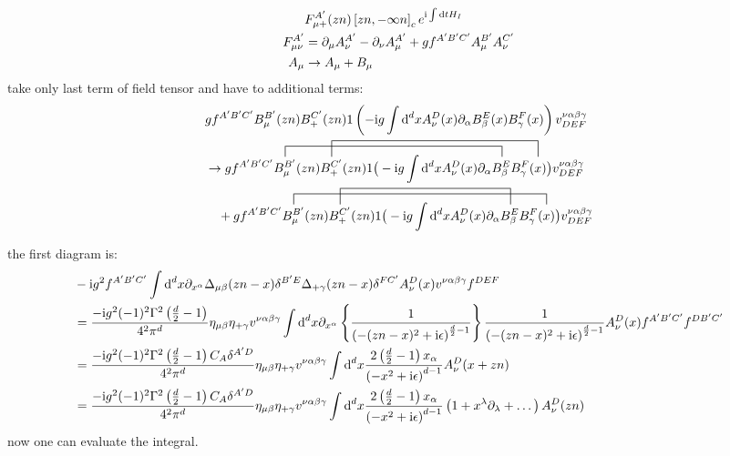 \begin{align}
	&F_{\mu +} ^{A'}(zn)\left[zn,-\infty n \right]_c e^{\text{i} \int \text{d} t H_I}
	\\
	F_{\mu\nu}^{A'} 
	&=
	\partial_\mu A_\nu^{A'}-\partial_\nu A_\mu ^{A'} + g f^{A'B'C'}A_\mu^{B'}A_\nu^{C'}
	\\
	A_\mu 
	&
	\rightarrow A_\mu +B_\mu
\end{align}
take only last term of field tensor and have to additional terms:
\begin{align}
	&
	gf^{A'B'C'} B_\mu^{B'}(zn)B_+^{C'}(zn) \idm \left(-\imag g \int \ddx x A_\nu ^D (x) \partial_\alpha B_\beta^E(x) B_\gamma^F(x) \right) v^{\nu\alpha\beta\gamma}_{DEF}
	\\
	&\rightarrow
	\contraction[2ex]{	gf^{A'B'C'}}{B_\mu^{B'}}{(zn)B_+^{C'}(zn) \idm \big(-\imag g \int \ddx xA_\nu ^D (x) \partial_\alpha}{B_\beta^E}
	\contraction[3ex]{	gf^{A'B'C'}B_\mu^{B'}(zn)}{B_+^{C'}}{(zn) \idm \big(-\imag g \int \ddx xA_\nu ^D (x) \partial_\alpha B_\beta^E(x)}{B_\gamma^F}
	gf^{A'B'C'} B_\mu^{B'}(zn)B_+^{C'}(zn) \idm \big(-\imag g \int \ddx xA_\nu ^D (x) \partial_\alpha B_\beta^E B_\gamma^F(x) \big) v^{\nu\alpha\beta\gamma}_{DEF}
	\nl
	+
	\contraction[2ex]{	gf^{A'B'C'}}{B_\mu^{B'}}{(zn)B_+^{C'}(zn) \idm \big(-\imag g \int \ddx xA_\nu ^D (x) \partial_\alpha B_\beta^E(x)}{B_\gamma^F}
	\contraction[3ex]{	gf^{A'B'C'}B_\mu^{B'}(zn)}{B_+^{C'}}{(zn) \idm \big(-\imag g \int \ddx xA_\nu ^D (x) \partial_\alpha }{B_\beta^E}
	gf^{A'B'C'} B_\mu^{B'}(zn)B_+^{C'}(zn) \idm \big(-\imag g \int \ddx xA_\nu ^D (x) \partial_\alpha B_\beta^E B_\gamma^F(x) \big) v^{\nu\alpha\beta\gamma}_{DEF}
\end{align}


the first diagram is:
\begin{align}
	&-\text{i} g^2f^{A'B'C'} \int \text{d} ^d x\partial_{x^\alpha} \Delta_{\mu \beta}(zn-x) \delta^{B' E} \Delta_{+ \gamma}(zn-x) \delta^{FC'} A_\nu^D(x) v^{\nu\alpha\beta\gamma} f^{DEF}
	\\
	&=
	\frac{-\text{i} g^2 (-1)^2 \Gamma^2\left(\frac{d}{2}-1\right)}{4^2 \pi^d} \eta_{\mu\beta} \eta_{+\gamma}v^{\nu\alpha\beta\gamma}\int \text{d} ^d x \partial_{x^\alpha} \left\{\frac{1}{\left(-(zn-x)^2+\text{i} \epsilon\right)^{\frac{d}{2}-1}}\right\}\frac{1}{\left(-(zn-x)^2+\text{i} \epsilon\right)^{\frac{d}{2}-1}}A_\nu^D(x)f^{A'B'C'}f^{DB'C'}
	\\
	&=
	\frac{-\text{i} g^2 (-1)^2 \Gamma^2\left(\frac{d}{2}-1\right)C_A\delta^{A'D}}{4^2 \pi^d} \eta_{\mu\beta} \eta_{+\gamma}v^{\nu\alpha\beta\gamma}\int \text{d} ^d x \frac{2\left(\frac{d}{2}-1\right)x_\alpha}{\left(-x^2+\text{i} \epsilon\right)^{d-1}}A_\nu^D(x+zn)
	\\
	&=
	\frac{-\text{i} g^2 (-1)^2 \Gamma^2\left(\frac{d}{2}-1\right)C_A\delta^{A'D}}{4^2 \pi^d} \eta_{\mu\beta} \eta_{+\gamma}v^{\nu\alpha\beta\gamma}\int \text{d} ^d x \frac{2\left(\frac{d}{2}-1\right)x_\alpha}{\left(-x^2+\text{i} \epsilon\right)^{d-1}}\left(1+x^\lambda\partial_\lambda +\dots\right) A_\nu^D(zn)
\end{align}
now one can evaluate the integral. 

